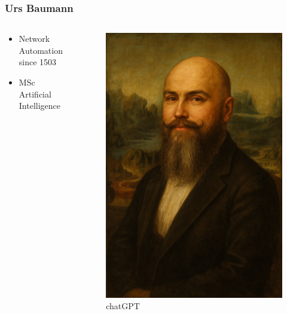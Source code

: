 \documentclass[aspectratio=169]{beamer}
\begin{document}
\begin{frame}[fragile]
  \frametitle{Urs Baumann}

  \begin{columns}
    \begin{column}{0.6\textwidth}
      \begin{itemize}
        \setlength\itemsep{1em}
        \item Network Automation since 1503
        \item MSc Artificial Intelligence
      \end{itemize}
    \end{column}
    \begin{column}{0.4\textwidth}
      \begin{figure}
        \includegraphics[height = 0.7\textheight]{images/urs_monalisa.png}
        \caption{\footnotesize chatGPT}
      \end{figure}
    \end{column}
  \end{columns} 
      


\end{frame}
\end{document}
